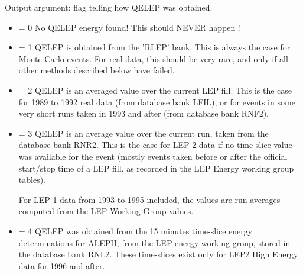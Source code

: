  
\begin{indentlist}{ 3.50cm}{ 3.75cm}
     Output argument:   flag telling how QELEP was obtained.
 
\begin{itemize}
\item                        = 0    No QELEP energy found! This should NEVER happen !

\item                        = 1    QELEP  is obtained from the 'RLEP' bank. This is always the case for Monte Carlo events.       
                                    For real data, this should be very rare, and only if all other methods described below 
                                    have failed.

\item                        = 2    QELEP  is an averaged value over the current LEP fill.
                                     This is the case for 1989 to 1992  real data (from database bank LFIL),
                                     or for events in some very short runs taken in 1993 
                                     and after (from database bank RNF2).

\item                        = 3    QELEP  is an average value over the current run, taken from the database bank RNR2. 
                                    This is the case for
                                    LEP 2 data if no time slice value was available for the event (mostly events taken before or
                                    after the official start/stop time of a LEP fill, as recorded in the LEP Energy working group
                                    tables).

                                     For LEP 1 data from 1993 to 1995 included, the values are run averages computed from the LEP
                                     Working Group values.

\item                        = 4    QELEP was obtained from the 15 minutes time-slice energy determinations for ALEPH, from the LEP
                                    energy working group, stored in the database bank RNL2. These time-slices exist
                                    only for LEP2 High Energy data for 1996 and after. 

\end{itemize}
\end{indentlist}


